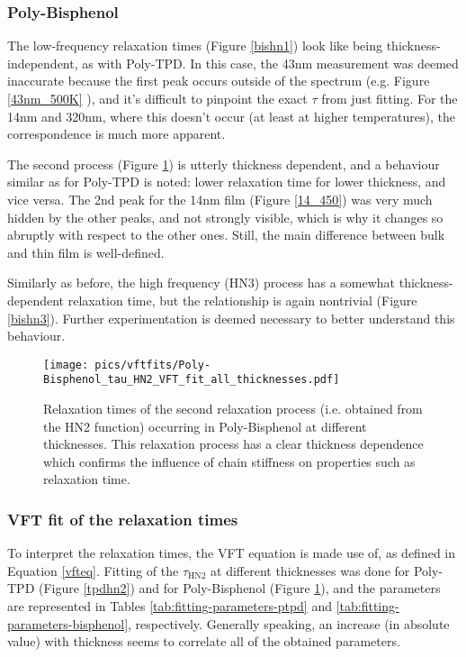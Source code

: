 \subsubsection{Poly-Bisphenol}
The low-frequency relaxation times (Figure \ref{bishn1}) look like being thickness-independent, as with Poly-TPD. In this case, the 43nm measurement was deemed inaccurate because the first peak occurs outside of the spectrum (e.g. Figure \ref{43nm_500K} %
), and it's difficult to pinpoint the exact $\tau$ from just fitting.
For the 14nm and 320nm, where this doesn't occur (at least at higher temperatures), the correspondence is much more apparent.

The second process (Figure \ref{bishn2}) is utterly thickness dependent, and a behaviour similar as for Poly-TPD is noted: lower relaxation time for lower thickness, and vice versa. The 2nd peak for the 14nm film (Figure \ref{14_450}) was very much hidden by the other peaks, and not strongly visible, which is why it changes so abruptly with respect to the other ones. Still, the main difference between bulk and thin film is well-defined.

Similarly as before, the high frequency (HN3) process has a somewhat thickness-dependent relaxation time, but the relationship is again nontrivial (Figure \ref{bishn3}). Further experimentation is deemed necessary to better understand this behaviour.

\begin{figure}[t]%
  \centering
  \texttt{[image: pics/vftfits/Poly-Bisphenol\_tau\_HN2\_VFT\_fit\_all\_thicknesses.pdf]}
  \caption{Relaxation times of the second relaxation process (i.e. obtained from the HN2 function) occurring in Poly-Bisphenol at different thicknesses. This relaxation process has a clear thickness dependence which confirms the influence of chain stiffness on properties such as relaxation time.}
  \label{bishn2}
\end{figure}%


\subsubsection{VFT fit of the relaxation times}
To interpret the relaxation times, the \ac{VFT} equation is made use of, as defined in Equation \ref{vfteq}. Fitting of the $\tau_{\text{HN2}}$ at different thicknesses was done for Poly-TPD (Figure \ref{tpdhn2}) and for Poly-Bisphenol (Figure \ref{bishn2}), and the parameters are represented in Tables \ref{tab:fitting-parameters-ptpd} and \ref{tab:fitting-parameters-bisphenol}, respectively.
Generally speaking, an increase (in absolute value) with thickness seems to correlate all of the obtained parameters.

